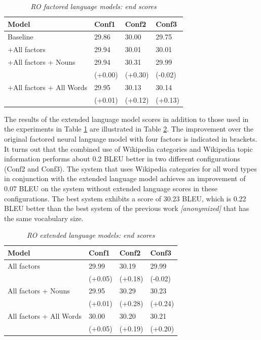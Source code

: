 \documentclass[a4paper]{article}
\newcommand{\anony}[1]{\textit{[anonymized]}}
\begin{document}
\begin{table}
\caption{\it RO factored language models: end scores}
\vspace{2mm}
\centering
  \begin{tabular}{llll}
  	\hline
  	Model                    & Conf1   & Conf2   & Conf3   \\ \hline\hline
  	Baseline                 & 29.86   & 30.00   & 29.75   \\
  	+All factors             & 29.94   & 30.01   & 30.01   \\ \hline
  	+All factors + Nouns     & 29.94   & 30.31   & 29.99   \\
  	                         & (+0.00) & (+0.30) & (-0.02) \\
  	+All factors + All Words & 29.95   & 30.13   & 30.14   \\
  	                         & (+0.01) & (+0.12) & (+0.13)
  \end{tabular}
  \label{tb:ro-factored-combi}
\end{table}

The results of the extended language model scores in addition to those used in the experiments in Table \ref{tb:ro-factored-combi} are illustrated in Table \ref{tb:ro-extended}. The improvement over the original factored neural language model with four factors is indicated in brackets. It turns out that the combined use of Wikipedia categories and Wikipedia topic information performs about 0.2 BLEU better in two different configurations (Conf2 and Conf3). The system that uses Wikipedia categories for all word types in conjunction with the extended language model achieves an improvement of 0.07 BLEU on the system without extended language scores in these configurations.
The best system exhibits a score of 30.23 BLEU, which is 0.22 BLEU better than the best system of the previous work \anony{\cite{niehuesusing}} that has the same vocabulary size.

\begin{table}
\caption{\it RO extended language models: end scores}
\vspace{2mm}
\centering
  \begin{tabular}{llll}
  	\hline
  	Model                   & Conf1   & Conf2   & Conf3   \\ \hline\hline
  	All factors             & 29.99   & 30.19   & 29.99   \\
  	                        & (+0.05) & (+0.18) & (-0.02) \\
  	All factors + Nouns     & 29.95   & 30.29   & 30.23   \\
  	                        & (+0.01) & (+0.28) & (+0.24) \\
  	All factors + All Words & 30.00   & 30.20   & 30.21   \\
  	                        & (+0.05) & (+0.19) & (+0.20)
  \end{tabular}
  \label{tb:ro-extended}
\end{table}
\end{document}
